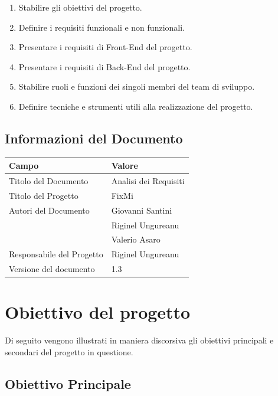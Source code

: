 \documentclass{report}
\begin{document}
\begin{enumerate}
		
	\item Stabilire gli obiettivi del progetto.
	\item Definire i requisiti funzionali e non funzionali.
	\item Presentare i requisiti di Front-End del progetto.
	\item Presentare i requisiti di Back-End del progetto.
	\item Stabilire ruoli e funzioni dei singoli membri del team di sviluppo.
	\item Definire tecniche e strumenti utili alla realizzazione del progetto.

\end{enumerate}


\section{Informazioni del Documento}

\begin{center} %
	\centering
	\begin{tabular}{ |p{4cm}|p{4cm}|  }
		\hline
		\centering Campo & \qquad\qquad Valore \\ %
		\hline
		Titolo del Documento & Analisi dei Requisiti \\
		\hline
		Titolo del Progetto & FixMi \\
		\hline
		Autori del Documento &
		Giovanni Santini \\ & Riginel Ungureanu \\ & Valerio Asaro \\
		\hline
		Responsabile del Progetto & Riginel Ungureanu\\
		\hline
		Versione del documento & 1.3 \\
		\hline
	\end{tabular}
\end{center}


\chapter{Obiettivo del progetto}


Di seguito vengono illustrati in maniera discorsiva gli obiettivi principali e secondari del progetto in questione.

\section{Obiettivo Principale}
\end{document}
